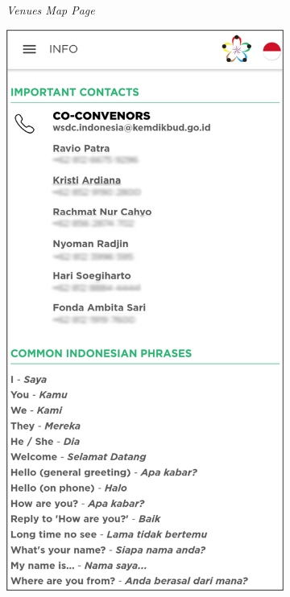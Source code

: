 \begin{figure}[H]
\begin{subfigure}[b]{0.21\textwidth}
	    \caption{{\it Venues Map Page}}
	    \label{fig:wsdcAppVenuesMap}
     \end{subfigure}
     \hfill
     \begin{subfigure}[b]{0.247\textwidth}
    \centering
	    \includegraphics[scale=0.4]{Gambar/InfoPage.png}

\end{subfigure}
\end{figure}
